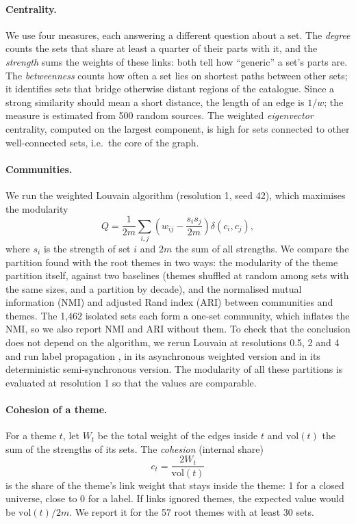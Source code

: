 \documentclass[10pt,a4paper]{article}
\begin{document}
\paragraph{Centrality.} We use four measures, each answering a different
question about a set. The \emph{degree} counts the sets that share at least a
quarter of their parts with it, and the \emph{strength} sums the weights of
these links: both tell how ``generic'' a set's parts are. The
\emph{betweenness} \cite{brandes2001} counts how often a set lies on shortest
paths between other sets; it identifies sets that bridge otherwise distant
regions of the catalogue. Since a strong similarity should mean a short
distance, the length of an edge is $1/w$; the measure is
estimated from 500 random sources. The weighted
\emph{eigenvector} centrality, computed on the largest
component, is high for sets connected to other well-connected sets, i.e.\ the
core of the graph.

\paragraph{Communities.} We run the weighted Louvain algorithm
\cite{blondel2008} (resolution 1, seed 42), which maximises the modularity
\cite{newman2004}
\begin{equation}
  Q = \frac{1}{2m}\sum_{i,j}\left(w_{ij} - \frac{s_i s_j}{2m}\right)\delta(c_i, c_j),
\end{equation}
where $s_i$ is the strength of set $i$ and $2m$ the sum of all strengths. We
compare the partition found with the root themes in two ways: the modularity
of the theme partition itself, against two baselines (themes shuffled at
random among sets with the same sizes, and a partition by decade), and the
normalised mutual information (NMI) and adjusted Rand index
(ARI) between communities and themes. The 1,462 isolated sets
each form a one-set community, which inflates the NMI, so we also report NMI
and ARI without them. To check that the conclusion does not depend on the
algorithm, we rerun Louvain at resolutions 0.5, 2 and 4 and run label
propagation \cite{raghavan2007}, in its asynchronous weighted version and in
its deterministic semi-synchronous version. The modularity
of all these partitions is evaluated at resolution 1 so that the values are
comparable.

\paragraph{Cohesion of a theme.} For a theme $t$, let $W_t$ be the total weight
of the edges inside $t$ and $\mathrm{vol}(t)$ the sum of the strengths of its
sets. The \emph{cohesion} (internal share)
\begin{equation}
  c_t = \frac{2W_t}{\mathrm{vol}(t)}
\end{equation}
is the share of the theme's link weight that stays inside the theme: 1 for a
closed universe, close to 0 for a label. If links ignored themes, the expected
value would be $\mathrm{vol}(t)/2m$. We report it for the 57 root themes with
at least 30 sets.
\end{document}
